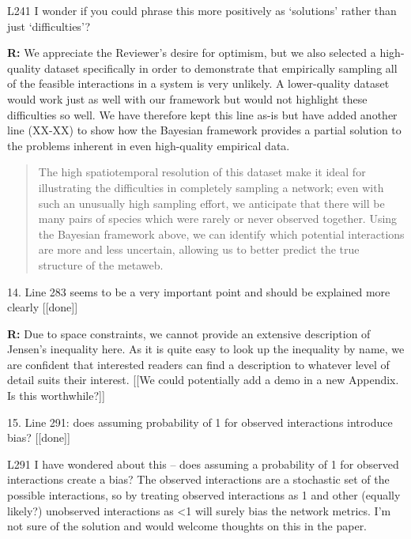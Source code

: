 \documentclass[12pt]{letter}
\newenvironment{refquote}{\bigskip \begin{it}}{\end{it}\smallskip}
\begin{document}
\begin{itemize}
		\begin{refquote}
		L241 I wonder if you could phrase this more positively as ‘solutions’ rather than just ‘difficulties’?
		\end{refquote}

		\textbf{R:} We appreciate the Reviewer's desire for optimism, but we also selected a high-quality dataset specifically in order to demonstrate that empirically sampling all of the feasible interactions in a system is very unlikely. A lower-quality dataset would work just as well with our framework but would not highlight these difficulties so well. We have therefore kept this line as-is but have added another line (XX-XX) to show how the Bayesian framework provides a partial solution to the problems inherent in even high-quality empirical data.

		\begin{quotation}
		 The high spatiotemporal resolution of this dataset make it ideal for illustrating the difficulties in completely sampling a network; even with such an unusually high sampling effort, we anticipate that there will be many pairs of species which were rarely or never observed together. Using the Bayesian framework above, we can identify which potential interactions are more and less uncertain, allowing us to better predict the true structure of the metaweb.
		 \end{quotation}


	14. Line 283 seems to be a very important point and should be explained more clearly [[done]]

		\textbf{R:} Due to space constraints, we cannot provide an extensive description of Jensen's inequality here. As it is quite easy to look up the inequality by name, we are confident that interested readers can find a description to whatever level of detail suits their interest. 
		[[We could potentially add a demo in a new Appendix. Is this worthwhile?]]


	15. Line 291: does assuming probability of 1 for observed interactions introduce bias? [[done]]

		\begin{refquote}
		L291 I have wondered about this – does assuming a probability of 1 for observed interactions create a bias? The observed interactions are a stochastic set of the possible interactions, so by treating observed interactions as 1 and other (equally likely?) unobserved interactions as <1 will surely bias the network metrics. I’m not sure of the solution and would welcome thoughts on this in the paper.
		\end{refquote}


\end{itemize}
\end{document}
